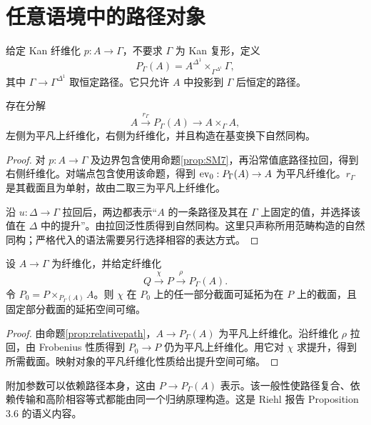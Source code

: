 \section{任意语境中的路径对象}
\begin{definition}[纤维内路径对象]
给定 Kan 纤维化 $p:A\to\Gamma$，不要求 $\Gamma$ 为 Kan 复形，定义
\[
P_\Gamma(A)=A^{\Delta^1}\times_{\Gamma^{\Delta^1}}\Gamma,
\]
其中 $\Gamma\to\Gamma^{\Delta^1}$ 取恒定路径。它只允许 $A$ 中投影到 $\Gamma$ 后恒定的路径。
\end{definition}
\begin{proposition}[相对路径分解]\label{prop:relativepath}
存在分解
\[
A\xrightarrow{r_\Gamma}P_\Gamma(A)
\longrightarrow A\times_\Gamma A,
\]
左侧为平凡上纤维化，右侧为纤维化，并且构造在基变换下自然同构。
\end{proposition}
\begin{proof}
对 $p:A\to\Gamma$ 及边界包含使用命题\ref{prop:SM7}，再沿常值底路径拉回，得到右侧纤维化。对端点包含使用该命题，得到 $\operatorname{ev}_0:P_\Gamma(A)\to A$ 为平凡纤维化。$r_\Gamma$ 是其截面且为单射，故由二取三为平凡上纤维化。

沿 $u:\Delta\to\Gamma$ 拉回后，两边都表示“$A$ 的一条路径及其在 $\Gamma$ 上固定的值，并选择该值在 $\Delta$ 中的提升”。由拉回泛性质得到自然同构。这里只声称所用范畴构造的自然同构；严格代入的语法需要另行选择相容的表达方式。
\end{proof}
\begin{theorem}
设 $A\to\Gamma$ 为纤维化，并给定纤维化
\[
Q\xrightarrow\chi P\xrightarrow\rho P_\Gamma(A).
\]
令 $P_0=P\times_{P_\Gamma(A)}A$。则 $\chi$ 在 $P_0$ 上的任一部分截面可延拓为在 $P$ 上的截面，且固定部分截面的延拓空间可缩。
\end{theorem}
\begin{proof}
由命题\ref{prop:relativepath}，$A\to P_\Gamma(A)$ 为平凡上纤维化。沿纤维化 $\rho$ 拉回，由 Frobenius 性质得到 $P_0\to P$ 仍为平凡上纤维化。用它对 $\chi$ 求提升，得到所需截面。映射对象的平凡纤维化性质给出提升空间可缩。
\end{proof}
\begin{remark}
附加参数可以依赖路径本身，这由 $P\to P_\Gamma(A)$ 表示。该一般性使路径复合、依赖传输和高阶相容等式都能由同一个归纳原理构造。这是 Riehl 报告 Proposition 3.6 的语义内容\cite{RiehlICM}。
\end{remark}
